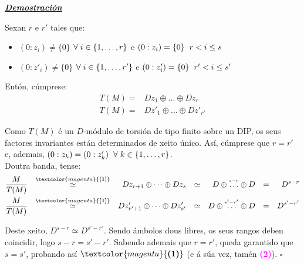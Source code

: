 \documentclass[twoside]{report}
\newcommand{\magbf}[1]{\textcolor{magenta}{\textbf{#1}}} %
\theoremstyle{mystyle}
\begin{document}
\vspace{2mm}

\noindent \textbf{\textit{\underline{Demostración}}}

\vspace{2mm}

\noindent Sexan $r$ e $r'$ tales que:

\begin{itemize}
    \item $(0 : z_{i}) \neq \{0\}$ \hspace{2mm} $\forall \hspace{1mm} i \in \{1, \dots, r\}$ e $(0 : z_{i}) = \{0\} \hspace{2mm} r < i \leq s$
    \item $(0 : z'_{i}) \neq \{0\}$ \hspace{2mm} $\forall \hspace{1mm} i \in \{1, \dots, r'\}$ e $(0 : z'_{i}) = \{0\} \hspace{2mm} r' < i \leq s'$
\end{itemize}

\noindent Entón, cúmprese:
\begin{align*}
    T(M) = & Dz_{1} \oplus \dots \oplus Dz_{r} \\
    T(M) = & Dz'_{1} \oplus \dots \oplus Dz'_{r'}
\end{align*}

\noindent Como $T(M)$ é un $D$-módulo de torsión de tipo finito sobre un DIP, os seus factores invariantes están determinados de xeito único. Así, cúmprese que $r = r'$ e, ademais, $(0 : z_{k}) = (0 : z'_{k}) \hspace{2mm} \forall \hspace{1mm} k \in \{1, \dots, r\}$.\\

\noindent Doutra banda, tense:
\begin{align*}
    \displaystyle \frac{M}{T(M)} & & \overset{\magbf{[1]}}{\simeq} & & Dz_{r+1} \oplus \dots \oplus Dz_{s} & & \simeq & & D \oplus \overset{^{s-r}}{\dots} \oplus D & & = & & D^{s-r}\\
    \displaystyle \frac{M}{T(M)} & & \overset{\magbf{[1]}}{\simeq} & & Dz'_{r'+1} \oplus \dots \oplus Dz'_{s'} & & \simeq & & D \oplus \overset{^{s'-r'}}{\dots} \oplus D & & = & & D^{s'-r'}\\
\end{align*}

\noindent Deste xeito, $D^{s-r} \simeq D^{s' - r'}$. Sendo ámbolos dous libres, os seus rangos deben coincidir, logo $s - r = s' - r'$. Sabendo ademais que $r = r'$, queda garantido que $s = s'$, probando así $\magbf{(1)}$ (e á súa vez, tamén \magbf{(2)}). $\square$\\
\end{document}
